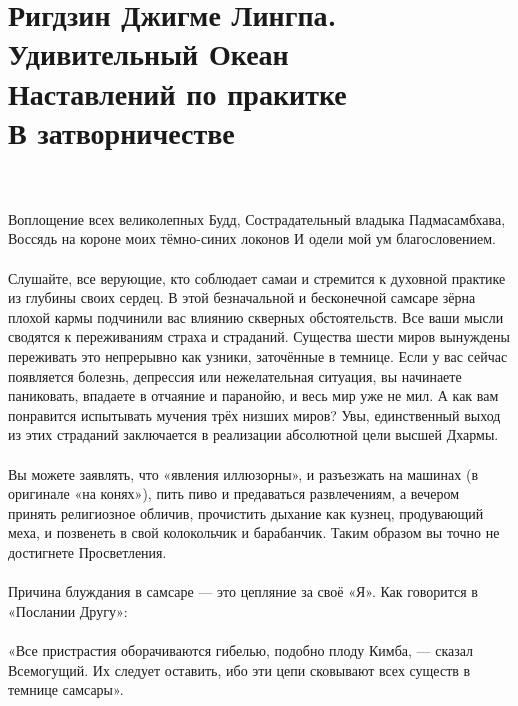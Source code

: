 \section{Ригдзин Джигме Лингпа.\\
Удивительный Океан\\
Наставлений по пракитке\\
В затворничестве}

\\ \\ Воплощение всех великолепных Будд, Сострадательный владыка Падмасамбхава, Воссядь на короне моих тёмно-синих локонов И одели мой ум благословением.
\\ \\ Слушайте, все верующие, кто соблюдает самаи и стремится к духовной практике из глубины своих сердец. В этой безначальной и бесконечной самсаре зёрна плохой кармы подчинили вас влиянию скверных обстоятельств. Все ваши мысли сводятся к переживаниям страха и страданий. Существа шести миров вынуждены переживать это непрерывно как узники, заточённые в темнице. Если у вас сейчас появляется болезнь, депрессия или нежелательная ситуация, вы начинаете паниковать, впадаете в отчаяние и паранойю, и весь мир уже не мил. А как вам понравится испытывать мучения трёх низших миров? Увы, единственный выход из этих страданий заключается в реализации абсолютной цели высшей Дхармы.
\\ \\ Вы можете заявлять, что «явления иллюзорны», и разъезжать на машинах (в оригинале «на конях»), пить пиво и предаваться развлечениям, а вечером принять религиозное обличив, прочистить дыхание как кузнец, продувающий меха, и позвенеть в свой колокольчик и барабанчик. Таким образом вы точно не достигнете Просветления.
\\ \\ Причина блуждания в самсаре — это цепляние за своё «Я». Как говорится в «Послании Другу»:
\\ \\ «Все пристрастия оборачиваются гибелью, подобно плоду Кимба, — сказал Всемогущий. Их следует оставить, ибо эти цепи сковывают всех существ в темнице самсары».
\newpage
